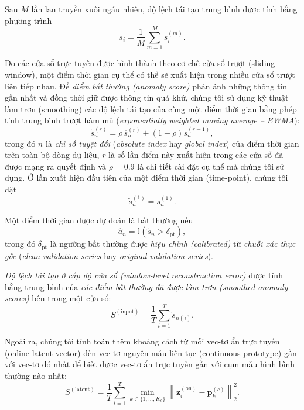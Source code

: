 Sau \(M\) lần lan truyền xuôi ngẫu nhiên, độ lệch tái tạo trung bình được tính bằng phương trình
\begin{equation}
\overline{s}_{i}
=
\frac{1}{M}
\sum_{m=1}^{M}
s^{(m)}_{i}.
\end{equation}

Do các cửa sổ trực tuyến được hình thành theo cơ chế cửa sổ trượt (sliding window), một điểm thời gian cụ thể có thể sẽ xuất hiện trong nhiều cửa sổ trượt liên tiếp nhau. Để \textit{điểm bất thường (anomaly score)} phản ánh những thông tin gần nhất và đồng thời giữ được thông tin quá khứ, chúng tôi sử dụng kỹ thuật làm trơn (smoothing) các độ lệch tái tạo của cùng một điểm thời gian bằng phép tính trung bình trượt hàm mũ (\textit{exponentially weighted moving average -- EWMA}):
\begin{equation}
\widetilde{s}^{(r)}_{n}
=
\rho\,\overline{s}^{(r)}_{n}
+
(1-\rho)\widetilde{s}^{(r-1)}_{n},
\end{equation}
trong đó \(n\) là \textit{chỉ số tuyệt đối} (\textit{absolute index} hay \textit{global index}) của điểm thời gian trên toàn bộ dòng dữ liệu, \(r\) là số lần điểm này xuất hiện trong các cửa sổ đã được mạng ra quyết định và \(\rho=0.9\) là chi tiết cài đặt cụ thể mà chúng tôi sử dụng. Ở lần xuất hiện đầu tiên của một điểm thời gian (time-point), chúng tôi đặt
\begin{equation}
\widetilde{s}^{(1)}_{n}
=
\overline{s}^{(1)}_{n}.
\end{equation}

Một điểm thời gian được dự đoán là bất thường nếu
\begin{equation}
\widehat{a}_{n}
=
\mathbb{I}
\left(
\widetilde{s}_{n}>\delta_{\mathrm{pt}}
\right),
\end{equation}
trong đó \(\delta_{\mathrm{pt}}\) là ngưỡng bất thường được \textit{hiệu chỉnh (calibrated)} từ \textit{chuỗi xác thực gốc} (\textit{clean validation series} hay \textit{original validation series}).

\textit{Độ lệch tái tạo ở cấp độ cửa sổ (window-level reconstruction error)} được tính bằng trung bình của \textit{các điểm bất thường đã được làm trơn (smoothed anomaly scores)} bên trong một cửa sổ:
\begin{equation}
S^{(\mathrm{input})}
=
\frac{1}{T}
\sum_{i=1}^{T}
\widetilde{s}_{n(i)}.
\end{equation}

Ngoài ra, chúng tôi tính toán thêm khoảng cách từ mỗi vec-tơ ẩn trực tuyến (online latent vector) đến vec-tơ nguyên mẫu liên tục (continuous prototype) gần với vec-tơ đó nhất để biết được vec-tơ ẩn trực tuyến gần với cụm mẫu hình bình thường nào nhất:
\begin{equation}
S^{(\mathrm{latent})}
=
\frac{1}{T}
\sum_{i=1}^{T}
\min_{k\in\{1,\ldots,K_c\}}
\left\|
\mathbf{z}^{(\mathrm{on})}_{i}
-
\mathbf{p}^{(c)}_k
\right\|_2^2.
\end{equation}


